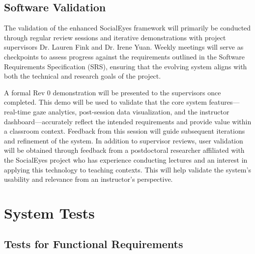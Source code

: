 \documentclass[12pt, titlepage]{article}
\begin{document}


\subsection{Software Validation}

The validation of the enhanced SocialEyes framework will primarily be conducted through regular review sessions and iterative demonstrations with project supervisors Dr. Lauren Fink and Dr. Irene Yuan. Weekly meetings will serve as checkpoints to assess progress against the requirements outlined in the Software Requirements Specification (SRS), ensuring that the evolving system aligns with both the technical and research goals of the project.
\newline

A formal Rev 0 demonstration will be presented to the supervisors once completed. This demo will be used to validate that the core system features—real-time gaze analytics, post-session data visualization, and the instructor dashboard—accurately reflect the intended requirements and provide value within a classroom context. Feedback from this session will guide subsequent iterations and refinement of the system.
In addition to supervisor reviews, user validation will be obtained through feedback from a postdoctoral researcher affiliated with the SocialEyes project who has experience conducting lectures and an interest in applying this technology to teaching contexts. This will help validate the system’s usability and relevance from an instructor’s perspective.
\newline


\section{System Tests}


\subsection{Tests for Functional Requirements}

\end{document}
